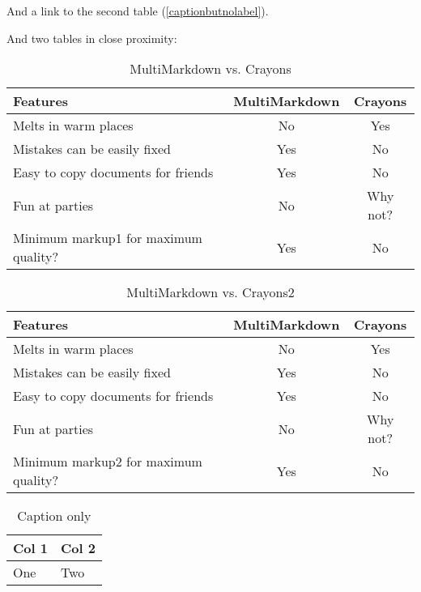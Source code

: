 And a link to the second table (\autoref{captionbutnolabel}).

And two tables in close proximity:

\begin{table}[htbp]
\begin{minipage}{\linewidth}
\setlength{\tymax}{0.5\linewidth}
\centering
\small
\caption{MultiMarkdown vs. Crayons}
\label{multimarkdownvs.crayons}
\begin{tabulary}{\textwidth}{@{}LCC@{}} \toprule
Features&MultiMarkdown&Crayons\\
\midrule
Melts in warm places&No&Yes\\
Mistakes can be easily fixed&Yes&No\\
Easy to copy documents for friends&Yes&No\\
Fun at parties&No&Why not?\\

\midrule
Minimum markup1 for maximum quality?&Yes&No\\

\bottomrule

\end{tabulary}
\end{minipage}
\end{table}


\begin{table}[htbp]
\begin{minipage}{\linewidth}
\setlength{\tymax}{0.5\linewidth}
\centering
\small
\caption{MultiMarkdown vs. Crayons2}
\label{multimarkdownvs.crayons2}
\begin{tabulary}{\textwidth}{@{}LCC@{}} \toprule
Features&MultiMarkdown&Crayons\\
\midrule
Melts in warm places&No&Yes\\
Mistakes can be easily fixed&Yes&No\\
Easy to copy documents for friends&Yes&No\\
Fun at parties&No&Why not?\\

\midrule
Minimum markup2 for maximum quality?&Yes&No\\

\bottomrule

\end{tabulary}
\end{minipage}
\end{table}


\begin{table}[htbp]
\begin{minipage}{\linewidth}
\setlength{\tymax}{0.5\linewidth}
\centering
\small
\caption{Caption only}
\label{captiononly}
\begin{tabulary}{\textwidth}{@{}LL@{}} \toprule
Col 1&Col 2\\
\midrule
One&Two \\

\bottomrule

\end{tabulary}
\end{minipage}
\end{table}


